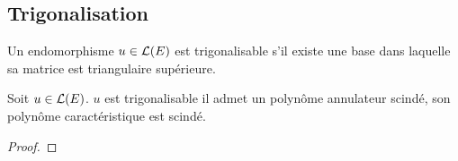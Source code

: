 \subsection{Trigonalisation}

\begin{definition}
    Un endomorphisme $u \in \mathcal{L}(E)$ est trigonalisable s'il existe une base dans laquelle sa matrice est triangulaire supérieure.
\end{definition}

\begin{theorem}
    Soit $u \in \mathcal{L}(E)$. $u$ est trigonalisable \ssi il admet un polynôme annulateur scindé, 
    \ssi son polynôme caractéristique est scindé.
\end{theorem}


\begin{proof}
\end{proof}


